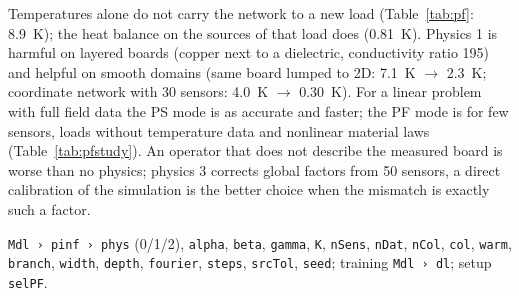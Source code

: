 \documentclass[11pt,a4paper]{article}
\newcommand{\cfg}[1]{\texttt{#1}}
\begin{document}
\begin{keybox}
Temperatures alone do not carry the network to a new load (Table~\ref{tab:pf}: \SI{8.9}{\kelvin}); the heat balance
on the sources of that load does (\SI{0.81}{\kelvin}). Physics 1 is harmful on layered boards (copper next to a
dielectric, conductivity ratio 195) and helpful on smooth domains (same board lumped to 2D: \SI{7.1}{\kelvin}
$\to$ \SI{2.3}{\kelvin}; coordinate network with 30 sensors: \SI{4.0}{\kelvin} $\to$ \SI{0.30}{\kelvin}). For a linear
problem with full field data the PS mode is as accurate and faster; the PF mode is for few sensors, loads without
temperature data and nonlinear material laws (Table~\ref{tab:pfstudy}). An operator that does not describe the
measured board is worse than no physics; physics 3 corrects global factors from 50 sensors, a direct calibration
of the simulation is the better choice when the mismatch is exactly such a factor.
\end{keybox}

\begin{cfgbox}
\cfg{Mdl › pinf › phys} (0/1/2), \cfg{alpha}, \cfg{beta}, \cfg{gamma}, \cfg{K}, \cfg{nSens}, \cfg{nDat}, \cfg{nCol},
\cfg{col}, \cfg{warm}, \cfg{branch}, \cfg{width}, \cfg{depth}, \cfg{fourier}, \cfg{steps}, \cfg{srcTol}, \cfg{seed};
training \cfg{Mdl › dl}; setup \cfg{selPF}.
\end{cfgbox}

\end{document}
